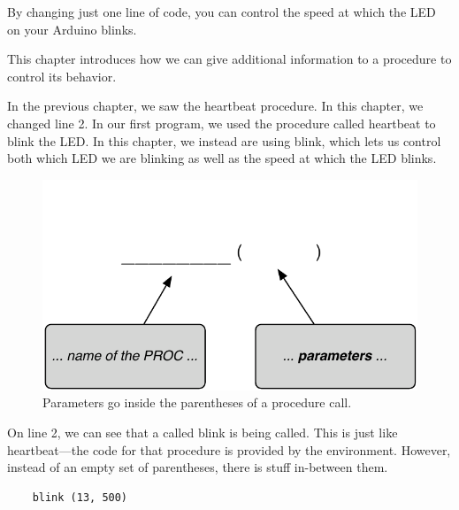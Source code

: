 
By changing just one line of code, you can control the speed at which the LED on your Arduino blinks.

\GOALS
This chapter introduces how we can give additional information to a procedure to control its behavior. 

\CODE



\PATTERNS
In the previous chapter, we saw the {\procname heartbeat} procedure. In this chapter, we changed line 2. In our first program, we used the \plumbing procedure called {\procname heartbeat} to blink the LED. In this chapter, we instead are using {\procname blink}, which lets us control both which LED we are blinking as well as the speed at which the LED blinks.

\begin{figure}[h]
  \begin{center}
    \includegraphics[width=\linewidth]{images/ch2-parameter-pattern}
    \caption{Parameters go inside the parentheses of a procedure call.}
    \label{pattern:ch2-parameters}
  \end{center}
\end{figure}

On line 2, we can see that a \PROCedure called {\procname blink} is being called. This is just like {\procname heartbeat}---the code for that procedure is provided by the \plumbing environment. However, instead of an empty set of parentheses, there is stuff in-between them. 

\begin{verbatim}
	blink (13, 500)
\end{verbatim}

